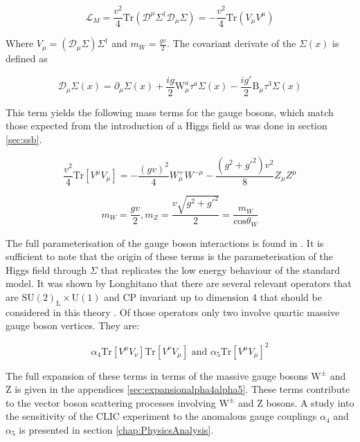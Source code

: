 \begin{equation}
\mathcal{L}_{M} = \frac{v^{2}}{4} \text{Tr} (\mathcal{D}^{\mu} \Sigma^{\dagger} \mathcal{D}_{\mu} \Sigma) = -\frac{v^{2}}{4}\text{Tr}(V_{\mu} V^{\mu})
\end{equation}

Where $V_{\mu} = (\mathcal{D}_{\mu}\Sigma) \Sigma^{\dagger}$ and $m_{W} = \frac{gv}{2}$.  The covariant derivate of the $\Sigma(x)$ is defined as

\begin{equation}
\mathcal{D}_{\mu} \Sigma(x) = \partial_{\mu} \Sigma(x) + \frac{ig}{2}\text{W}_{\mu}^{a}\tau^{a}\Sigma(x) - \frac{ig'}{2}\text{B}_{\mu}\tau^{3}\Sigma(x)
\end{equation}

This term yields the following mass terms for the gauge bosons, which match those expected from the introduction of a Higgs field as was done in section \ref{sec:ssb}.

\begin{equation}
\frac{v^{2}}{4}\text{Tr}[V^{\mu}V_{\mu}] = - \frac{(gv)^{2}}{4} W^{+}_{\mu} W^{-\mu} - \frac{(g^{2} + g'^{2})v^{2}}{8} Z_{\mu} Z^{\mu}
\end{equation}

\begin{equation}
m_{W} = \frac{gv}{2}, m_{Z} = \frac{v\sqrt{g^{2} + g'^{2}}}{2} = \frac{m_{W}}{\text{cos}{\theta_{W}}}
\end{equation}

The full parameterisation of the gauge boson interactions is found in \cite{Herrero:1994tj}.  It is sufficient to note that the origin of these terms is the parameterisation of the Higgs field through $\Sigma$ that replicates the low energy behaviour of the standard model.  It was shown by Longhitano that there are several relevant operators that are $\text{SU}(2)_{\text{L}} \times \text{U}(1)$ and CP invariant up to dimension 4 that should be considered in this theory \cite{Longhitano:1980tm}.  Of those operators only two involve quartic massive gauge boson vertices.  They are:

\begin{equation}
\alpha_{4}\text{Tr}[V^{\mu}V_{\nu}]\text{Tr}[V^{\nu}V_{\mu}] \text{ and } \alpha_{5}\text{Tr}[V^{\mu}V_{\mu}]^{2}
\end{equation}

The full expansion of these terms in terms of the massive gauge bosons $\text{W}^{\pm}$ and Z is given in the appendices \ref{sec:expansionalpha4alpha5}.  These terms contribute to the vector boson scattering processes involving $\text{W}^{\pm}$ and Z bosons.  A study into the sensitivity of the CLIC experiment to the anomalous gauge couplings $\alpha_{4}$ and $\alpha_{5}$ is presented in section \ref{chap:PhysicsAnalysis}.



